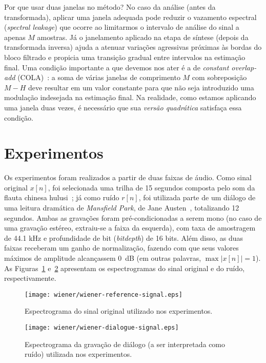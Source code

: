 Por que usar duas janelas no método? No caso da análise (antes da transformada),
aplicar uma janela adequada pode reduzir o vazamento espectral (\textit{spectral
	leakage}) que ocorre ao limitarmos o intervalo de análise do sinal a apenas $M$
amostras. Já o janelamento aplicado na etapa de síntese (depois da transformada
inversa) ajuda a atenuar variações agressivas próximas às bordas do bloco filtrado e
propicia uma transição gradual entre intervalos na estimação final. Uma condição
importante a que devemos nos ater é a de \textit{constant overlap-add}
(COLA)~\cite{bosi-2002}: a soma de várias
janelas de comprimento $M$ com sobreposição $M-H$ deve resultar em um valor constante
para que não seja introduzido uma modulação indesejada na estimação final. Na
realidade, como estamos aplicando uma janela duas vezes, é necessário que sua
\emph{versão quadrática} satisfaça essa condição.

\section{Experimentos}
\label{section:wf:experiments}

Os experimentos foram realizados a partir de duas faixas de áudio. Como sinal original
$x[n]$, foi selecionada uma trilha de 15 segundos composta pelo som da flauta chinesa
hulusi~\cite{wiener-reference-source}; já como ruído $r[n]$, foi utilizada parte de um
diálogo de uma leitura dramática de \textit{Mansfield Park}, de Jane
Austen~\cite{wiener-dialogue-source}, totalizando 12 segundos. Ambas as gravações foram
pré-condicionadas a serem mono (no caso de uma gravação estéreo, extraiu-se a faixa da
esquerda), com taxa de amostragem de 44.1 kHz e profundidade de bit (\textit{bitdepth})
de 16 bits. Além disso, as duas faixas receberam um ganho de normalização, fazendo com
que seus valores máximos de amplitude alcançassem 0~dB (em outras palavras, $\max
	\left| x[n] \right| = 1$). As Figuras~\ref{fig:wf:spectogram-reference}
e~\ref{fig:wf:spectogram-dialogue} apresentam os espectrogramas do sinal original e do
ruído, respectivamente.
\begin{figure}[!ht]
	\centering
	\texttt{[image: wiener/wiener-reference-signal.eps]}
	\caption[Espetrograma do sinal original usado nos experimentos]{Espectrograma do sinal original utilizado nos experimentos.}
	\label{fig:wf:spectogram-reference}
\end{figure}
\begin{figure}[!ht]
	\centering
	\texttt{[image: wiener/wiener-dialogue-signal.eps]}
	\caption[Espetrograma do ruído usado nos experimentos]{Espectrograma da gravação de diálogo (a ser interpretada como ruído) utilizada nos experimentos.}
	\label{fig:wf:spectogram-dialogue}
\end{figure}

